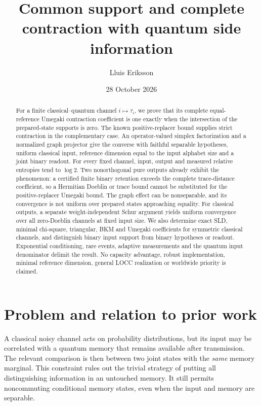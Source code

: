\documentclass[11pt]{article}
\title{Common support and complete contraction with quantum side information}
\author{Lluis Eriksson}
\date{28 October 2026}
\theoremstyle{remark}\newtheorem{remark}[theorem]{Remark}
\begin{document}
\maketitle
\begin{abstract}
For a finite classical--quantum channel $i\mapsto\tau_i$, we prove that its complete equal-reference Umegaki contraction coefficient is one exactly when the intersection of the prepared-state supports is zero. The known positive-replacer bound supplies strict contraction in the complementary case. An operator-valued simplex factorization and a normalized graph projector give the converse with faithful separable hypotheses, uniform classical input, reference dimension equal to the input alphabet size and a joint binary readout. For every fixed channel, input, output and measured relative entropies tend to $\log2$. Two nonorthogonal pure outputs already exhibit the phenomenon: a certified finite binary retention exceeds the complete trace-distance coefficient, so a Hermitian Doeblin or trace bound cannot be substituted for the positive-replacer Umegaki bound. The graph effect can be nonseparable, and its convergence is not uniform over prepared states approaching equality. For classical outputs, a separate weight-independent Schur argument yields uniform convergence over all zero-Doeblin channels at fixed input size. We also determine exact SLD, minimal chi-square, triangular, BKM and Umegaki coefficients for symmetric classical channels, and distinguish binary input support from binary hypotheses or readout. Exponential conditioning, rare events, adaptive measurements and the quantum input denominator delimit the result. No capacity advantage, robust implementation, minimal reference dimension, general LOCC realization or worldwide priority is claimed.
\end{abstract}

\section{Problem and relation to prior work}
A classical noisy channel acts on probability distributions, but its input may be correlated with a quantum memory that remains available after transmission. The relevant comparison is then between two joint states with the \emph{same} memory marginal. This constraint rules out the trivial strategy of putting all distinguishing information in an untouched memory. It still permits noncommuting conditional memory states, even when the input and memory are separable.
\end{document}
